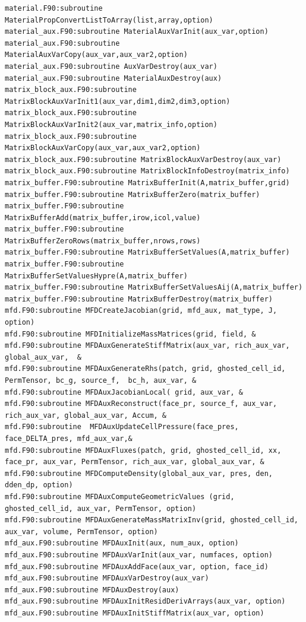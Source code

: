 \documentclass[12pt]{article}
\begin{document}
\begin{verbatim}
material.F90:subroutine MaterialPropConvertListToArray(list,array,option)
material_aux.F90:subroutine MaterialAuxVarInit(aux_var,option)
material_aux.F90:subroutine MaterialAuxVarCopy(aux_var,aux_var2,option)
material_aux.F90:subroutine AuxVarDestroy(aux_var)
material_aux.F90:subroutine MaterialAuxDestroy(aux)
matrix_block_aux.F90:subroutine MatrixBlockAuxVarInit1(aux_var,dim1,dim2,dim3,option)
matrix_block_aux.F90:subroutine MatrixBlockAuxVarInit2(aux_var,matrix_info,option)
matrix_block_aux.F90:subroutine MatrixBlockAuxVarCopy(aux_var,aux_var2,option)
matrix_block_aux.F90:subroutine MatrixBlockAuxVarDestroy(aux_var)
matrix_block_aux.F90:subroutine MatrixBlockInfoDestroy(matrix_info)
matrix_buffer.F90:subroutine MatrixBufferInit(A,matrix_buffer,grid)
matrix_buffer.F90:subroutine MatrixBufferZero(matrix_buffer)
matrix_buffer.F90:subroutine MatrixBufferAdd(matrix_buffer,irow,icol,value)
matrix_buffer.F90:subroutine MatrixBufferZeroRows(matrix_buffer,nrows,rows)
matrix_buffer.F90:subroutine MatrixBufferSetValues(A,matrix_buffer)
matrix_buffer.F90:subroutine MatrixBufferSetValuesHypre(A,matrix_buffer)
matrix_buffer.F90:subroutine MatrixBufferSetValuesAij(A,matrix_buffer)
matrix_buffer.F90:subroutine MatrixBufferDestroy(matrix_buffer)
mfd.F90:subroutine MFDCreateJacobian(grid, mfd_aux, mat_type, J, option)
mfd.F90:subroutine MFDInitializeMassMatrices(grid, field, &
mfd.F90:subroutine MFDAuxGenerateStiffMatrix(aux_var, rich_aux_var, global_aux_var,  &
mfd.F90:subroutine MFDAuxGenerateRhs(patch, grid, ghosted_cell_id, PermTensor, bc_g, source_f,  bc_h, aux_var, &
mfd.F90:subroutine MFDAuxJacobianLocal( grid, aux_var, &
mfd.F90:subroutine MFDAuxReconstruct(face_pr, source_f, aux_var, rich_aux_var, global_aux_var, Accum, &
mfd.F90:subroutine  MFDAuxUpdateCellPressure(face_pres, face_DELTA_pres, mfd_aux_var,&
mfd.F90:subroutine MFDAuxFluxes(patch, grid, ghosted_cell_id, xx, face_pr, aux_var, PermTensor, rich_aux_var, global_aux_var, &
mfd.F90:subroutine MFDComputeDensity(global_aux_var, pres, den, dden_dp, option)
mfd.F90:subroutine MFDAuxComputeGeometricValues (grid, ghosted_cell_id, aux_var, PermTensor, option)
mfd.F90:subroutine MFDAuxGenerateMassMatrixInv(grid, ghosted_cell_id,  aux_var, volume, PermTensor, option)
mfd_aux.F90:subroutine MFDAuxInit(aux, num_aux, option)
mfd_aux.F90:subroutine MFDAuxVarInit(aux_var, numfaces, option)
mfd_aux.F90:subroutine MFDAuxAddFace(aux_var, option, face_id)
mfd_aux.F90:subroutine MFDAuxVarDestroy(aux_var)
mfd_aux.F90:subroutine MFDAuxDestroy(aux)
mfd_aux.F90:subroutine MFDAuxInitResidDerivArrays(aux_var, option)
mfd_aux.F90:subroutine MFDAuxInitStiffMatrix(aux_var, option)

\end{verbatim}
\end{document}
